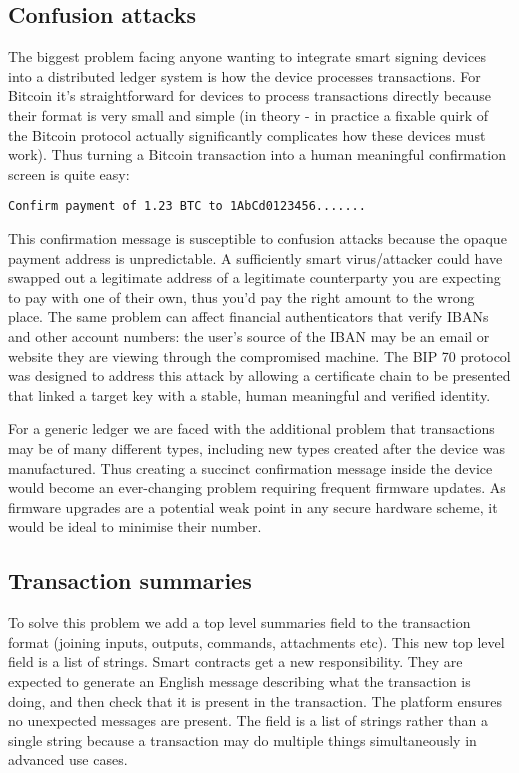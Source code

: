 \documentclass{article}
\begin{document}
\subsection{Confusion attacks}

The biggest problem facing anyone wanting to integrate smart signing devices into a distributed ledger system is how the
device processes transactions. For Bitcoin it's straightforward for devices to process transactions directly because
their format is very small and simple (in theory - in practice a fixable quirk of the Bitcoin protocol actually
significantly complicates how these devices must work). Thus turning a Bitcoin transaction into a human meaningful
confirmation screen is quite easy:

\indent\texttt{Confirm payment of 1.23 BTC to 1AbCd0123456.......}

This confirmation message is susceptible to confusion attacks because the opaque payment address is unpredictable. A
sufficiently smart virus/attacker could have swapped out a legitimate address of a legitimate counterparty you are
expecting to pay with one of their own, thus you'd pay the right amount to the wrong place. The same problem can affect
financial authenticators that verify IBANs and other account numbers: the user's source of the IBAN may be an email or
website they are viewing through the compromised machine. The BIP 70\cite{BIP70} protocol was designed to address this
attack by allowing a certificate chain to be presented that linked a target key with a stable, human meaningful and
verified identity.

For a generic ledger we are faced with the additional problem that transactions may be of many different types,
including new types created after the device was manufactured. Thus creating a succinct confirmation message inside the
device would become an ever-changing problem requiring frequent firmware updates. As firmware upgrades are a potential
weak point in any secure hardware scheme, it would be ideal to minimise their number.

\subsection{Transaction summaries}

To solve this problem we add a top level summaries field to the transaction format (joining inputs, outputs, commands,
attachments etc). This new top level field is a list of strings. Smart contracts get a new responsibility. They are
expected to generate an English message describing what the transaction is doing, and then check that it is present in
the transaction. The platform ensures no unexpected messages are present. The field is a list of strings rather than
a single string because a transaction may do multiple things simultaneously in advanced use cases.
\end{document}
